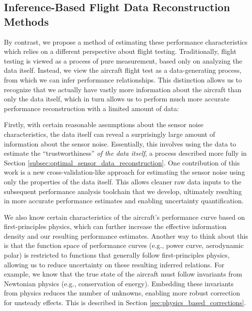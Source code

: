 \documentclass[conf]{new-aiaa}
\begin{document}
    \subsection{Inference-Based Flight Data Reconstruction Methods}

    By contrast, we propose a method of estimating these performance characteristics which relies on a different perspective about flight testing. Traditionally, flight testing is viewed as a process of pure measurement, based only on analyzing the data itself. Instead, we view the aircraft flight test as a data-generating process, from which we can infer performance relationships. This distinction allows us to recognize that we actually have vastly more information about the aircraft than only the data itself, which in turn allows us to perform much more accurate performance reconstruction with a limited amount of data:

    Firstly, with certain reasonable assumptions about the sensor noise characteristics, the data itself can reveal a surprisingly large amount of information about the sensor noise. Essentially, this involves using the data to estimate the ``trustworthiness'' \emph{of the data itself}, a process described more fully in Section \ref{subsec:optimal_sensor_data_reconstruction}. One contribution of this work is a new cross-validation-like approach for estimating the sensor noise using only the properties of the data itself. This allows cleaner raw data inputs to the subsequent performance analysis toolchain that we develop, ultimately resulting in more accurate performance estimates and enabling uncertainty quantification.

    We also know certain characteristics of the aircraft's performance curve based on first-principles physics, which can further increase the effective information density and our resulting performance estimates. Another way to think about this is that the function space of performance curves (e.g., power curve, aerodynamic polar) is restricted to functions that generally follow first-principles physics, allowing us to reduce uncertainty on these resulting inferred relations. For example, we know that the true state of the aircraft must follow invariants from Newtonian physics (e.g., conservation of energy). Embedding these invariants from physics reduces the number of unknowns, enabling more robust correction for unsteady effects. This is described in Section \ref{sec:physics_based_corrections}.
\end{document}
